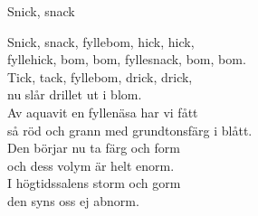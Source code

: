 \begin{song}{Snick, snack}
	
	
	
	Snick, snack, fyllebom, hick, hick,\\
	fyllehick, bom, bom, fyllesnack, bom, bom.\\
	Tick, tack, fyllebom, drick, drick,\\
	nu slår drillet ut i blom.\\
	Av aquavit en fyllenäsa har vi fått\\
	så röd och grann med grundtonsfärg i blått.\\
	Den börjar nu ta färg och form\\
	och dess volym är helt enorm.\\
	I högtidssalens storm och gorm\\
	den syns oss ej abnorm.
	
\end{song}
